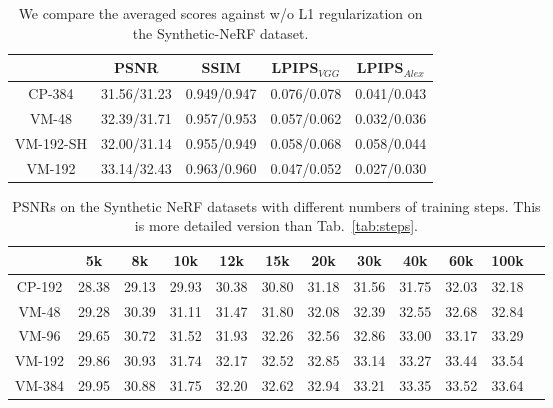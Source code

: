 \documentclass[runningheads]{llncs}
\begin{document}
\begin{table*}[htpb]
    \centering
\centering
        \renewcommand\tabcolsep{5.0pt}
        \begin{tabular}{c|cccc}
& PSNR & SSIM & LPIPS$_{VGG}$&LPIPS$_{Alex}$ \\
        \hline CP-384      & 31.56/31.23 & 0.949/0.947 & 0.076/0.078 & 0.041/0.043 \\
            VM-48       & 32.39/31.71 & 0.957/0.953 & 0.057/0.062 & 0.032/0.036  \\
            VM-192-SH   & 32.00/31.14 & 0.955/0.949 & 0.058/0.068 & 0.058/0.044  \\
            VM-192      & 33.14/32.43 & 0.963/0.960 & 0.047/0.052 & 0.027/0.030  \\
        \hline
        \end{tabular}
    \caption{We compare the averaged scores against w/o L1 regularization on the Synthetic-NeRF dataset.}
    \label{tab:ab_regularization} \vspace{-2mm}
\end{table*}



\begin{table*}[htpb]
    \centering
\centering
        \renewcommand\tabcolsep{4.0pt}
        \begin{tabular}{c|ccccccccccc}
        \hline
                        & 5k & 8k & 10k & 12k & 15k & 20k & 30k & 40k & 60k & 100k \\
        \hline\hline
            CP-192 & 28.38 & 29.13 & 29.93 & 30.38 & 30.80 & 31.18 & 31.56 & 31.75 & 32.03 & 32.18 \\
            VM-48  & 29.28 & 30.39 & 31.11 & 31.47 & 31.80 & 32.08 & 32.39 & 32.55 & 32.68 & 32.84 \\
            VM-96  & 29.65 & 30.72 & 31.52 & 31.93 & 32.26 & 32.56 & 32.86 & 33.00 & 33.17 & 33.29 \\
            VM-192 & 29.86 & 30.93 & 31.74 & 32.17 & 32.52 & 32.85 & 33.14 & 33.27 & 33.44 & 33.54 \\
            VM-384 & 29.95 & 30.88 & 31.75 & 32.20 & 32.62 & 32.94 & 33.21 & 33.35 & 33.52 & 33.64 \\
        \hline
        \end{tabular}
    \caption{PSNRs on the Synthetic NeRF datasets with different numbers of training steps. This is more detailed version than Tab.~\ref{tab:steps}.}
    \label{tab:steps_more} \vspace{-4mm}
\end{table*} 
\end{document}
